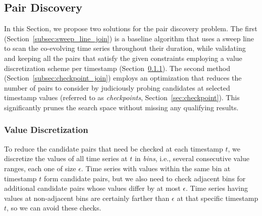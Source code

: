 \subsection{Pair Discovery}
\label{sec:local_join}
In this Section, we propose two solutions for the pair discovery problem. The first (Section~\ref{subsec:sweep_line_join}) is a baseline algorithm that uses a sweep line to scan the co-evolving time series throughout their duration, while validating and keeping all the pairs that satisfy the given constraints employing a value discretization scheme per timestamp (Section~\ref{subsec:indexing}). The second method (Section~\ref{subsec:checkpoint_join}) employs an optimization that reduces the number of pairs to consider by judiciously probing candidates at selected timestamp values (referred to as \textit{checkpoints}, Section~\ref{sec:checkpoint}). This significantly prunes the search space without missing any qualifying results.



\subsubsection{Value Discretization}
\label{subsec:indexing}
To reduce the candidate pairs that need be checked at each timestamp $t$, we discretize the values of all time series at $t$ in {\em bins}, i.e., several consecutive value ranges, each one of size $\epsilon$. Time series with values within the same bin at timestamp $t$ form candidate pairs, but we also need to check adjacent bins for additional candidate pairs whose values differ by at most $\epsilon$. Time series having values at non-adjacent bins are certainly farther than $\epsilon$ at that specific timestamp $t$, so we can avoid these checks. 

